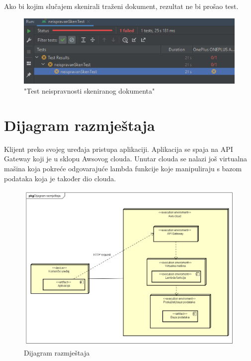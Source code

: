 Ako bi kojim slučajem skenirali traženi dokument, rezultat ne bi prošao test.

\begin{figure}[H]
	\centering
	\includegraphics[scale=1]{./slike/test5.png}
	\caption{"Test neispravnosti skeniranog dokumenta"}
	\label{fig:test5}
\end{figure}\eject





	
		
		
		
		
		
		
			
			
			\eject 
		
		
	\section{Dijagram razmještaja}
	
	
	Klijent preko svojeg uređaja pristupa aplikaciji. Aplikacija se spaja na API Gateway koji je u sklopu Awsovog clouda. Unutar clouda se nalazi još virtualna mašina koja pokreće odgovarajuće lambda funkcije koje manipuliraju s bazom podataka koja je također dio clouda.
	
	\eject
	
	
	\begin{figure}
		\includegraphics[width=\linewidth]{./dijagrami/dijagram_razmjestaja.png}
		\caption{Dijagram razmještaja}
		\label{fig:Raz}
	\end{figure}
	
